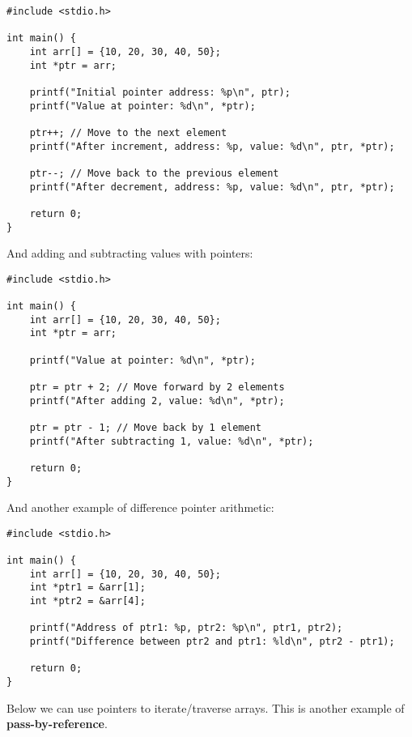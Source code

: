 \documentclass[a4paper,12pt]{article}
\begin{document}
\lstset{language=C}
\begin{lstlisting}[caption=Pointer Arithmetic]
#include <stdio.h>

int main() {
    int arr[] = {10, 20, 30, 40, 50};
    int *ptr = arr;

    printf("Initial pointer address: %p\n", ptr);
    printf("Value at pointer: %d\n", *ptr);

    ptr++; // Move to the next element
    printf("After increment, address: %p, value: %d\n", ptr, *ptr);

    ptr--; // Move back to the previous element
    printf("After decrement, address: %p, value: %d\n", ptr, *ptr);

    return 0;
}

\end{lstlisting}

And adding and subtracting values with pointers:\\

\lstset{language=C}
\begin{lstlisting}[caption=Incrementing and decrementing with pointers]
#include <stdio.h>

int main() {
    int arr[] = {10, 20, 30, 40, 50};
    int *ptr = arr;

    printf("Value at pointer: %d\n", *ptr);

    ptr = ptr + 2; // Move forward by 2 elements
    printf("After adding 2, value: %d\n", *ptr);

    ptr = ptr - 1; // Move back by 1 element
    printf("After subtracting 1, value: %d\n", *ptr);

    return 0;
}
\end{lstlisting}

And another example of difference pointer arithmetic:

\begin{lstlisting}[caption=Pointer differences]
#include <stdio.h>

int main() {
    int arr[] = {10, 20, 30, 40, 50};
    int *ptr1 = &arr[1];
    int *ptr2 = &arr[4];

    printf("Address of ptr1: %p, ptr2: %p\n", ptr1, ptr2);
    printf("Difference between ptr2 and ptr1: %ld\n", ptr2 - ptr1);

    return 0;
}
\end{lstlisting}

Below we can use pointers to iterate/traverse arrays. This is another example of \textbf{pass-by-reference}.
\end{document}
